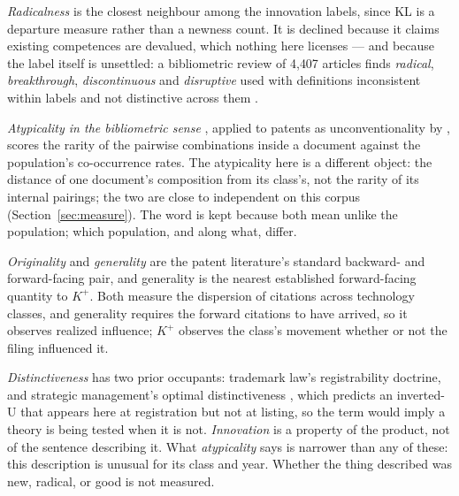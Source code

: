 \emph{Radicalness} is the closest neighbour among the innovation labels,
since KL is a departure measure rather than a newness count. It is
declined because it claims existing competences are devalued, which
nothing here licenses --- and because the label itself is unsettled: a
bibliometric review of 4{,}407 articles finds \emph{radical},
\emph{breakthrough}, \emph{discontinuous} and \emph{disruptive} used with
definitions inconsistent within labels and not distinctive across them
\citep{Verhoeven2025}.

\emph{Atypicality in the bibliometric sense} \citep{Uzzi2013}, applied to
patents as unconventionality by \citet{BerkesGaetani2021}, scores the
rarity of the pairwise combinations inside a document against the
population's co-occurrence rates. The atypicality here is a different
object: the distance of one document's composition from its class's, not
the rarity of its internal pairings; the two are close to independent on
this corpus (Section~\ref{sec:measure}). The word is kept because both
mean unlike the population; which population, and along what, differ.

\emph{Originality} and \emph{generality} \citep{HallJaffe2001} are the
patent literature's standard backward- and forward-facing pair, and
generality is the nearest established forward-facing quantity to $K^+$.
Both measure the dispersion of citations across technology classes,
and generality requires the forward citations to have arrived, so it
observes realized influence; $K^+$ observes the class's movement whether
or not the filing influenced it.

\emph{Distinctiveness} has two prior occupants: trademark law's
registrability doctrine, and strategic management's optimal
distinctiveness \citep{Zhao2017}, which predicts an inverted-U that
appears here at registration but not at listing, so the term would imply
a theory is being tested when it is not. \emph{Innovation} is a property
of the product, not of the sentence describing it. What
\emph{atypicality} says is narrower than any of these: this description
is unusual for its class and year. Whether the thing described was new,
radical, or good is not measured.
